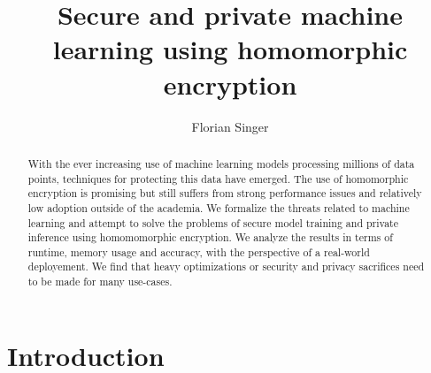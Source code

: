 \documentclass[a4paper,11pt,oneside]{report}
\title{Secure and private machine learning using homomorphic encryption}
\author{Florian Singer}
\begin{document}
\maketitle

\begin{abstract}

With the ever increasing use of machine learning models processing millions of data points, techniques for protecting this data have emerged.
The use of homomorphic encryption is promising but still suffers from strong performance issues and relatively low adoption outside of the academia.
We formalize the threats related to machine learning and attempt to solve the problems of secure model training and private inference using homomomorphic encryption.
We analyze the results in terms of runtime, memory usage and accuracy, with the perspective of a real-world deployement.
We find that heavy optimizations or security and privacy sacrifices need to be made for many use-cases.

\end{abstract}

\maketoc


\chapter{Introduction}

\end{document}
